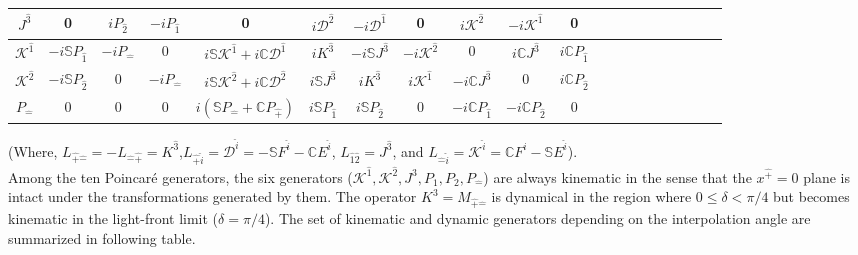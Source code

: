 \documentclass[12pt,a4paper]{report}
\newcommand{\pT}{\hat{+}}
\newcommand{\mT}{\hat{-}}
\newcommand{\itP}[1]{\hat{#1}}
\begin{document}
\begin{center}
{\begin{tabular}{ |c|c|c|c|c|c|c|c|c|c|c|c|c|c|c|c|c|c|c|c| }
 \hline 
 \rule{0pt}{16pt}$J^{\hat{3}}$ &0&$iP_{\hat{2}}$&$-iP_{\hat{1}}$&0&$i\mathcal{D}^{\hat{2}}$&$-i\mathcal{D}^{\hat{1}}$&0&$i\mathcal{K}^{\hat{2}}$&$-i\mathcal{K}^{\hat{1}}$&0\\
 \hline 
 \rule{0pt}{16pt}$\mathcal{K}^{\hat{1}}$ &$-i\mathbb{S}P_{\hat{1}}$&$-iP_{\hat{-}}$&0&$i\mathbb{S}\mathcal{K}^{\hat{1}}+i\mathbb{C}\mathcal{D}^{\hat{1}}$&$iK^{\hat{3}}$&$-i\mathbb{S}J^{\hat{3}}$&$-i\mathcal{K}^{\hat{2}}$&0&$i\mathbb{C}J^{\hat{3}}$&$i\mathbb{C}P_{\hat{1}}$\\
 \hline 
 \rule{0pt}{16pt}$\mathcal{K}^{\hat{2}}$ &$-i\mathbb{S}P_{\hat{2}}$&0&$-iP_{\hat{-}}$&$i\mathbb{S}\mathcal{K}^{\hat{2}}+i\mathbb{C}\mathcal{D}^{\hat{2}}$&$i\mathbb{S}J^{\hat{3}}$&$iK^{\hat{3}}$&$i\mathcal{K}^{\hat{1}}$&$-i\mathbb{C}J^{\hat{3}}$&0&$i\mathbb{C}P_{\hat{2}}$\\
 \hline 
 \rule{0pt}{16pt}$P_{\hat{-}}$ &0&0&0&$i\left(\mathbb{S}P_{\hat{-}}+\mathbb{C}P_{\hat{+}}\right)$&$i\mathbb{S}P_{\hat{1}}$&$i\mathbb{S}P_{\hat{2}}$&0&$-i\mathbb{C}P_{\hat{1}}$&$-i\mathbb{C}P_{\hat{2}}$&0\\
 \hline 
\end{tabular}}
\end{center}
(Where, $L_{\hat{+}\hat{-}}=-L_{\hat{-}\hat{+}}=K^\hat{3}$,$L_{\hat{+}\hat{i}}=\mathcal{D}^{\hat{i}}=-\mathbb{S}F^{\hat{i}}-\mathbb{C}E^{\hat{i}}$, $L_{\hat{1}\hat{2}}=J^\hat{3}$, and $L_{\hat{-}\hat{i}}=\mathcal{K}^{\hat{i}}=\mathbb{C}F^{\hat{i}}-\mathbb{S}E^{\hat{i}}$).
\\
Among the ten Poincar\'e generators, the six generators ($\mathcal{K}^{\itP{1}}, \mathcal{K}^{\itP{2}}, J^{3}, P_{1}, P_{2}, P_{\mT}$) are always kinematic in the sense that the $x^{\pT}=0$ plane is intact under the transformations generated by them. The operator $K^{3}=M_{\pT\mT}$ is dynamical in the region where $0\leq\delta<\pi/4$ but becomes kinematic in the light-front limit ($\delta=\pi/4$).
The set of kinematic and dynamic generators depending on the interpolation angle are summarized in following table.\cite{poin, gauge}
\end{document}
